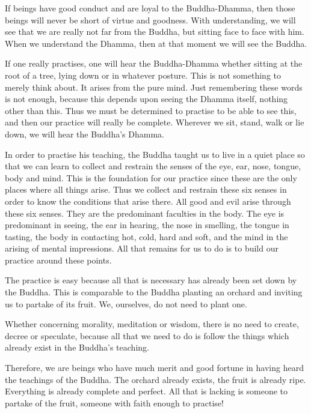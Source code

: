 If beings have good conduct and are loyal to the Buddha-Dhamma, then those beings will never be short of virtue and goodness. With understanding, we will see that we are really not far from the Buddha, but sitting face to face with him. When we understand the Dhamma, then at that moment we will see the Buddha. 

If one really practises, one will hear the Buddha-Dhamma whether sitting at the root of a tree, lying down or in whatever posture. This is not something to merely think about. It arises from the pure mind. Just remembering these words is not enough, because this depends upon seeing the Dhamma itself, nothing other than this. Thus we must be determined to practise to be able to see this, and then our practice will really be complete. Wherever we sit, stand, walk or lie down, we will hear the Buddha's Dhamma. 

In order to practise his teaching, the Buddha taught us to live in a quiet place so that we can learn to collect and restrain the senses of the eye, ear, nose, tongue, body and mind. This is the foundation for our practice since these are the only places where all things arise. Thus we collect and restrain these six senses in order to know the conditions that arise there. All good and evil arise through these six senses. They are the predominant faculties in the body. The eye is predominant in seeing, the ear in hearing, the nose in smelling, the tongue in tasting, the body in contacting hot, cold, hard and soft, and the mind in the arising of mental impressions. All that remains for us to do is to build our practice around these points. 

The practice is easy because all that is necessary has already been set down by the Buddha. This is comparable to the Buddha planting an orchard and inviting us to partake of its fruit. We, ourselves, do not need to plant one. 

Whether concerning morality, meditation or wisdom, there is no need to create, decree or speculate, because all that we need to do is follow the things which already exist in the Buddha's teaching. 

Therefore, we are beings who have much merit and good fortune in having heard the teachings of the Buddha. The orchard already exists, the fruit is already ripe. Everything is already complete and perfect. All that is lacking is someone to partake of the fruit, someone with faith enough to practise! 

